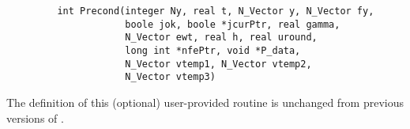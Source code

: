 \begin{itemize}
\begin{verbatim}
         int Precond(integer Ny, real t, N_Vector y, N_Vector fy, 
                     boole jok, boole *jcurPtr, real gamma, 
                     N_Vector ewt, real h, real uround, 
                     long int *nfePtr, void *P_data, 
                     N_Vector vtemp1, N_Vector vtemp2,
                     N_Vector vtemp3)

\end{verbatim}

The definition of this (optional) user-provided routine is unchanged from
previous versions of {\code}.

\end{itemize}







